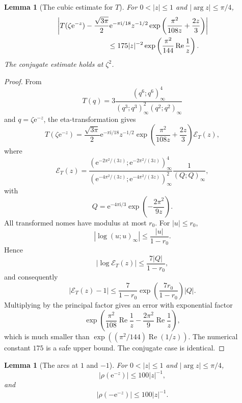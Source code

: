 \documentclass[11pt]{article}
\newtheorem{lemma}[theorem]{Lemma}
\theoremstyle{remark}
\newcommand{\ii}{\mathrm i}
\newcommand{\e}{\mathrm e}
\newcommand{\Repart}{\operatorname{Re}}
\begin{document}
\begin{lemma}[The cubic estimate for $T$]\label{lem:cubic-T}
For $0<|z|\leq1$ and $|\arg z|\leq\pi/4$,
\begin{align}\label{eq:T-cubic-est}
&\left|
T(\zeta\e^{-z})
-
\frac{\sqrt{3\pi}}2\e^{-\pi\ii/18}z^{-1/2}
\exp\left(\frac{\pi^2}{108z}+\frac{2z}{3}\right)
\right|  \\
&\hspace{1.0in}\leq
175 |z|^{-2}\exp\left(\frac{\pi^2}{144}\Repart\frac1z\right).
\end{align}
The conjugate estimate holds at $\zeta^2$.
\end{lemma}

\begin{proof}
From
\[
T(q)=3\frac{(q^6;q^6)_\infty^4}{(q^3;q^3)_\infty^2(q^2;q^2)_\infty}
\]
and $q=\zeta\e^{-z}$, the eta-transformation gives
\[
T(\zeta\e^{-z})
=
\frac{\sqrt{3\pi}}2\e^{-\pi\ii/18}z^{-1/2}
\exp\left(\frac{\pi^2}{108z}+\frac{2z}{3}\right)\mathcal E_T(z),
\]
where
\[
\mathcal E_T(z)=
\frac{(\e^{-2\pi^2/(3z)};\e^{-2\pi^2/(3z)})_\infty^4}
{(\e^{-4\pi^2/(3z)};\e^{-4\pi^2/(3z)})_\infty^2}
\frac1{(Q;Q)_\infty},
\]
with
\[
Q=\e^{-4\pi\ii/3}\exp\left(-\frac{2\pi^2}{9z}\right).
\]
All transformed nomes have modulus at most $r_0$.  For $|u|\leq r_0$,
\[
|\log (u;u)_\infty|\leq \frac{|u|}{1-r_0}.
\]
Hence
\[
|\log \mathcal E_T(z)|\leq \frac{7|Q|}{1-r_0},
\]
and consequently
\[
|\mathcal E_T(z)-1|
\leq
\frac{7}{1-r_0}\exp\left(\frac{7r_0}{1-r_0}\right)|Q|.
\]
Multiplying by the principal factor gives an error with exponential factor
\[
\exp\left(\frac{\pi^2}{108}\Repart\frac1z
-
\frac{2\pi^2}{9}\Repart\frac1z\right),
\]
which is much smaller than
$\exp((\pi^2/144)\Repart(1/z))$.  The numerical constant $175$ is a safe upper
bound.  The conjugate case is identical.
\end{proof}


\begin{lemma}[The arcs at $1$ and $-1$]\label{lem:one-minusone-local}
For $0<|z|\leq1$ and $|\arg z|\leq\pi/4$,
\begin{equation}\label{eq:one-est}
|\rho(\e^{-z})|\leq100|z|^{-1},
\end{equation}
and
\begin{equation}\label{eq:minusone-est}
|\rho(-\e^{-z})|\leq100|z|^{-1}.
\end{equation}
\end{lemma}
\end{document}
